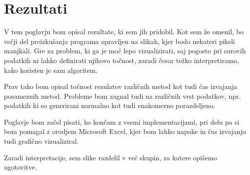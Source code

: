 \chapter{Rezultati}
V tem poglavju bom opisal rezultate, ki sem jih pridobil. Kot sem že omenil, bo večji del preizkušanja programa opravljen na slikah, kjer bodo nekateri piksli manjkali. Gre za problem, ki ga je moč lepo vizualizirati, saj pogosto pri surovih podatkih ni lahko definirati njihovo točnost, zaradi česar težko interpretiramo, kako koristen je sam algoritem.

Prav tako bom opisal točnost rezulatov različnih metod kot tudi čas izvajanja posameznih metod. Probleme bom zagnal tudi na različnih vrst podatkov, npr. podatkih ki so generirani normalno kot tudi enakomerno porazdeljeno.

Poglavje bom začel pisati, ko končam z vsemi implementacijami, pri delu pa si bom pomagal z orodjem Microsoft Excel, kjer bom lahko napake in čas izvajanja tudi grafično vizualiziral. 

Zaradi interpretacije, sem slike razdelil v več skupin, za katere opišemo ugotovitve.

